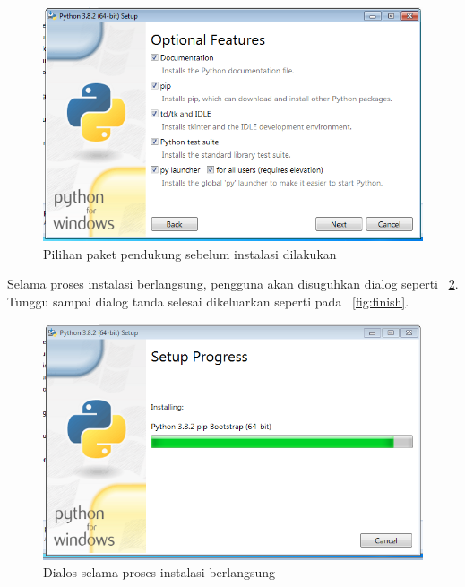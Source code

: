 \begin{figure}[h!]
  \begin{center}
    \includegraphics[scale=.5]{pics/featureInstall.png}
    \caption{Pilihan paket pendukung sebelum instalasi dilakukan}
    \label{fig:feature}
  \end{center}
\end{figure}

Selama proses instalasi berlangsung, pengguna akan disuguhkan dialog seperti \figurename~\ref{fig:installProgres}. Tunggu sampai dialog tanda selesai dikeluarkan seperti pada \figurename~\ref{fig:finish}.

\begin{figure}[h!]
  \begin{center}
    \includegraphics[scale=.5]{pics/installProgress.png}
    \caption{Dialos selama proses instalasi berlangsung}
    \label{fig:installProgres}
  \end{center}
\end{figure}

